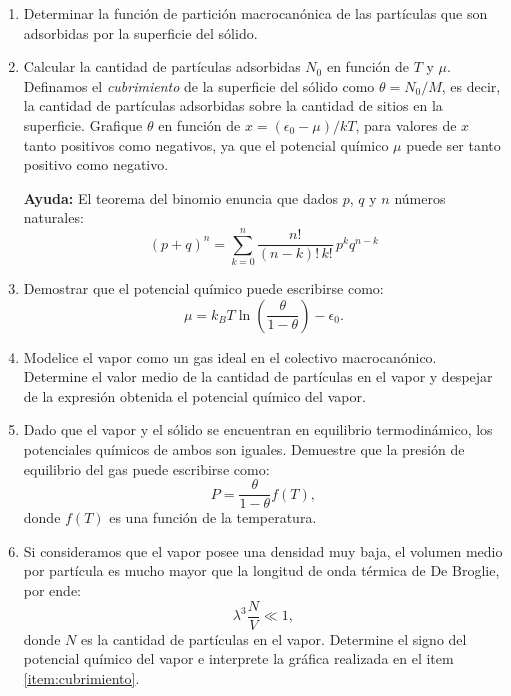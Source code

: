 \documentclass[a4paper,11pt]{article}
\begin{document}
\begin{enumerate}[label=(\alph*),
                  leftmargin=2\parindent,
                  rightmargin=2\parindent]

    \item{Determinar la función de partición macrocanónica de las 
          partículas que son adsorbidas por la superficie del sólido.}

    \item{\label{item:cubrimiento}
          Calcular la cantidad de partículas adsorbidas $N_0$ en función de 
          $T$ y $\mu$.
          Definamos el \emph{cubrimiento} de la superficie del sólido como 
          $\theta = N_0/M$, es decir, la cantidad de partículas adsorbidas 
          sobre la cantidad de sitios en la superficie.
          Grafique $\theta$ en función de $x = (\epsilon_0 - \mu)/kT$, para 
          valores de $x$ tanto positivos como negativos, ya que el potencial 
          químico $\mu$ puede ser tanto positivo como negativo.}
          
    {\small
    \textbf{Ayuda:}
    El teorema del binomio enuncia que dados $p$, $q$ y $n$ números 
    naturales:
    $$ (p + q)^n = \sum_{k=0}^n \frac{n!}{(n-k)! \, k!} \, p^k q^{n-k} $$
    }
    
    \item{Demostrar que el potencial químico puede escribirse 
          como:
          $$
          \mu =
          k_B T \ln \left( \frac{\theta}{1 - \theta} \right) - \epsilon_0.
          $$
          }
    
    \item{Modelice el vapor como un gas ideal en el colectivo macrocanónico.
          Determine el valor medio de la cantidad de partículas en el vapor y 
          despejar de la expresión obtenida el potencial químico del vapor.
          }
    
    \item{Dado que el vapor y el sólido se encuentran en equilibrio 
          termodinámico, los potenciales químicos de ambos son iguales. 
          Demuestre que la presión de equilibrio del gas puede escribirse 
          como:
          $$ P = \frac{\theta}{1 - \theta} f(T), $$
          donde $f(T)$ es una función de la temperatura.
          }
    
    \item{Si consideramos que el vapor posee una densidad muy baja, el volumen 
          medio por partícula es mucho mayor que la longitud de onda térmica 
          de De Broglie, por ende:
          $$ \lambda^3 \frac{N}{V} \ll 1, $$
          donde $N$ es la cantidad de partículas en el vapor.
          Determine el signo del potencial químico del vapor e interprete la 
          gráfica realizada en el item \ref{item:cubrimiento}. }

\end{enumerate}
\end{document}
